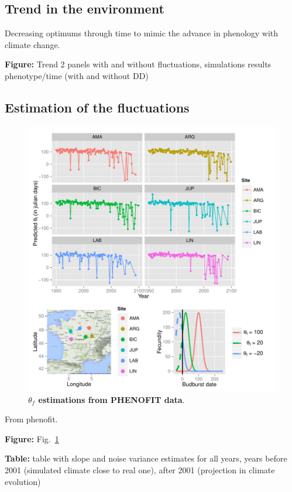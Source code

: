 \subsection*{Trend in the environment}

Decreasing optimums through time to mimic the advance in phenology with climate change.

\textbf{Figure:} Trend 2 panels with and without fluctuations, simulations results phenotype/time (with and without DD)

\subsection*{Estimation of the fluctuations}

\begin{figure}[ht!]
	\centering
	\includegraphics[scale=1]{Figures/optsmaps.pdf}
	\caption{\textbf{$\theta_{f}$ estimations from PHENOFIT data}.}
	\label{fig:thetaf}
\end{figure}

From phenofit.

\textbf{Figure:} Fig.~\ref{fig:thetaf}

\textbf{Table:} table with slope and noise variance estimates for all years, years before 2001 (simulated climate close to real one), after 2001 (projection in climate evolution)